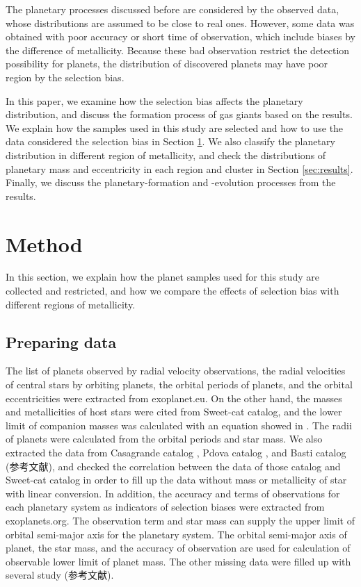 \documentclass[twocolumn, dvipdfmx]{aastex62}
\begin{document}
\begin{CJK*}{UTF8}{min}
The planetary processes discussed before are considered by the observed data, whose distributions are assumed to be close to real ones. However, some data was obtained with poor accuracy or short time of observation, which include biases by the difference of metallicity. Because these bad observation restrict the detection possibility for planets, the distribution of discovered planets may have poor region by the selection bias.

In this paper, we examine how the selection bias affects the planetary distribution, and discuss the formation process of gas giants based on the results. We explain how the samples used in this study are selected and how to use the data considered the selection bias in Section \ref{sec:method}. We also classify the planetary distribution in different region of metallicity, and check the distributions of planetary mass and eccentricity in each region and cluster in Section \ref{sec:results}. Finally, we discuss the planetary-formation and -evolution processes from the results.


\section{Method} \label{sec:method}

In this section, we explain how the planet samples used for this study are collected and restricted, and how we compare the effects of selection bias with different regions of metallicity.


\subsection{Preparing data} \label{subsec:prepare}

The list of planets observed by radial velocity observations, the radial velocities of central stars by orbiting planets, the orbital periods of planets, and the orbital eccentricities were extracted from exoplanet.eu. On the other hand, the masses and metallicities of host stars were cited from Sweet-cat catalog, and the lower limit of companion masses was calculated with an equation showed in \cite{2008ApJ...677.1324T}. The radii of planets were calculated from the orbital periods and star mass. We also extracted the data from Casagrande catalog \citep{2011A&A...530A.138C}, Pdova catalog \citep{2011MNRAS.416..727C}, and Basti catalog (参考文献), and checked the correlation between the data of those catalog and Sweet-cat catalog in order to fill up the data without mass or metallicity of star with linear conversion. In addition, the accuracy and terms of observations for each planetary system as indicators of selection biases were extracted from exoplanets.org. The observation term and star mass can supply the upper limit of orbital semi-major axis for the planetary system. The orbital semi-major axis of planet, the star mass, and the accuracy of observation are used for calculation of observable lower limit of planet mass. The other missing data were filled up with several study (参考文献).


\end{CJK*}
\end{document}
